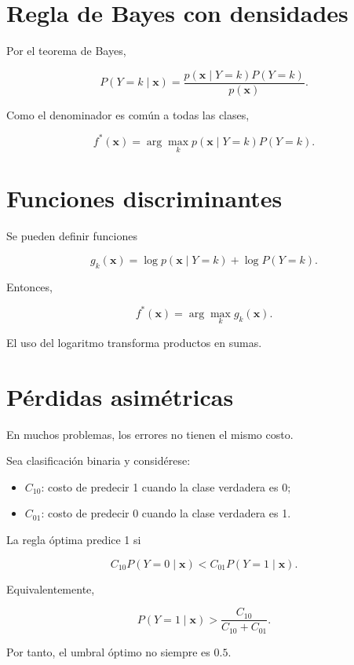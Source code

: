 \documentclass[
  spanish,
  11pt,
  letterpaper,
  DIV=11,
  numbers=noendperiod]{scrreprt}
\providecommand{\tightlist}{%
  \setlength{\itemsep}{0pt}\setlength{\parskip}{0pt}}
\theoremstyle{definition}
\theoremstyle{plain}
\theoremstyle{definition}
\theoremstyle{remark}
\begin{document}
\section{Regla de Bayes con
densidades}\label{regla-de-bayes-con-densidades}

Por el teorema de Bayes,

\[
P(Y=k\mid\mathbf{x})
=
\frac{
p(\mathbf{x}\mid Y=k)P(Y=k)
}{
p(\mathbf{x})
}.
\]

Como el denominador es común a todas las clases,

\[
f^{*}(\mathbf{x})
=
\arg\max_k
p(\mathbf{x}\mid Y=k)P(Y=k).
\]

\section{Funciones discriminantes}\label{funciones-discriminantes}

Se pueden definir funciones

\[
g_k(\mathbf{x})
=
\log p(\mathbf{x}\mid Y=k)
+
\log P(Y=k).
\]

Entonces,

\[
f^{*}(\mathbf{x})
=
\arg\max_k
g_k(\mathbf{x}).
\]

El uso del logaritmo transforma productos en sumas.

\section{Pérdidas asimétricas}\label{puxe9rdidas-asimuxe9tricas}

En muchos problemas, los errores no tienen el mismo costo.

Sea clasificación binaria y considérese:

\begin{itemize}
\tightlist
\item
  \(C_{10}\): costo de predecir 1 cuando la clase verdadera es 0;
\item
  \(C_{01}\): costo de predecir 0 cuando la clase verdadera es 1.
\end{itemize}

La regla óptima predice 1 si

\[
C_{10}P(Y=0\mid\mathbf{x})
<
C_{01}P(Y=1\mid\mathbf{x}).
\]

Equivalentemente,

\[
P(Y=1\mid\mathbf{x})
>
\frac{
C_{10}
}{
C_{10}+C_{01}
}.
\]

Por tanto, el umbral óptimo no siempre es \(0.5\).
\end{document}
